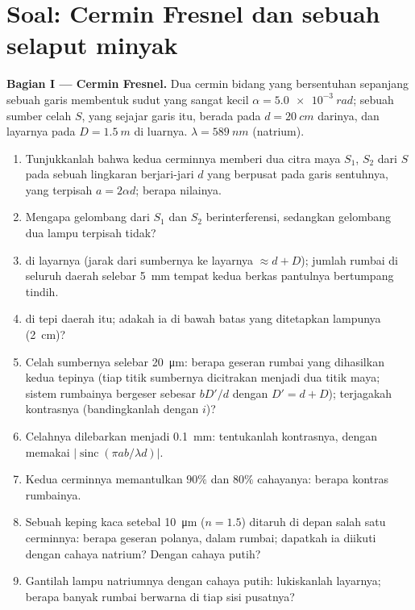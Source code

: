 \section{Soal: Cermin Fresnel dan sebuah selaput minyak}

\begin{problem}
\label{pb:b2:two-wave-interference:1}

\medskip
\noindent\textbf{Bagian I --- Cermin Fresnel.}
Dua cermin bidang yang bersentuhan sepanjang sebuah garis membentuk sudut yang sangat kecil $\alpha =
\qty{5.0e-3}{rad}$; sebuah sumber celah $S$, yang sejajar garis itu, berada pada $d =
\qty{20}{cm}$ darinya, dan layarnya pada $D = \qty{1.5}{m}$ di luarnya. $\lambda =
\qty{589}{nm}$ (natrium).
\begin{enumerate}
  \item Tunjukkanlah bahwa kedua cerminnya memberi dua citra maya $S_1$, $S_2$ dari
        $S$ pada sebuah lingkaran berjari-jari $d$ yang berpusat pada garis sentuhnya,
        yang terpisah $a = 2\alpha d$; berapa nilainya.
  \item Mengapa gelombang dari $S_1$ dan $S_2$ berinterferensi, sedangkan gelombang
        dua lampu terpisah tidak?
  \item {} di layarnya (jarak dari sumbernya ke
        layarnya $\approx d + D$); jumlah rumbai di seluruh daerah selebar
        \qty{5}{mm} tempat kedua berkas pantulnya bertumpang tindih.
  \item {} di tepi daerah itu; adakah ia di bawah
        batas yang ditetapkan  lampunya (\qty{2}{cm})?
  \item Celah sumbernya selebar \qty{20}{\micro m}: berapa geseran rumbai
        yang dihasilkan kedua tepinya (tiap titik sumbernya dicitrakan menjadi dua
        titik maya; sistem rumbainya bergeser sebesar $bD'/d$ dengan $D' =
        d + D$); terjagakah kontrasnya (bandingkanlah dengan $i$)?
  \item Celahnya dilebarkan menjadi \qty{0.1}{mm}: tentukanlah kontrasnya, dengan memakai
        $|\operatorname{sinc}(\pi ab/\lambda d)|$.
  \item Kedua cerminnya memantulkan $90\%$ dan $80\%$ cahayanya: berapa kontras
        rumbainya.
  \item Sebuah keping kaca setebal \qty{10}{\micro m} ($n = 1.5$) ditaruh di
        depan salah satu cerminnya: berapa geseran polanya, dalam rumbai; dapatkah ia
        diikuti dengan cahaya natrium? Dengan cahaya putih?
  \item Gantilah lampu natriumnya dengan cahaya putih: lukiskanlah layarnya;
        berapa banyak rumbai berwarna di tiap sisi pusatnya?
\end{enumerate}


\end{problem}
